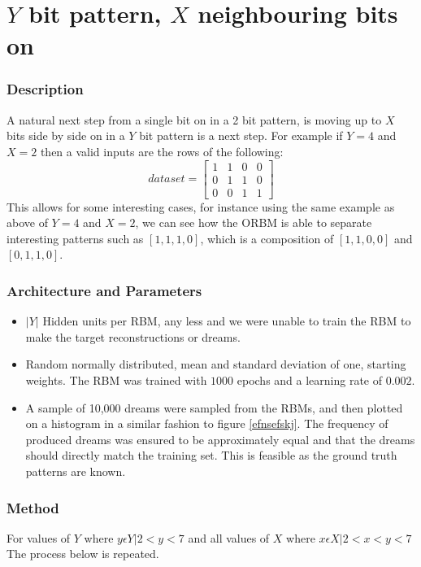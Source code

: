 \section{$Y$ bit pattern, $X$ neighbouring bits on}

\subsubsection{Description}
A natural next step from a single bit on in a 2 bit pattern, is moving up to $X$  bits side by side on in a $Y$ bit pattern is a next step. For example if $Y = 4 $ and $ X = 2 $ then a valid inputs are the rows of the following:
$$ dataset =
\begin{bmatrix}
  1 & 1 & 0 & 0 \\
  0 & 1 & 1 & 0 \\
  0 & 0 & 1 & 1
\end{bmatrix}
$$
This allows for some interesting cases, for instance using the same example as above of $Y = 4 $ and $ X = 2 $, we can see how the ORBM is able to separate interesting patterns such as $[1,1,1,0]$, which is a composition of $[1,1,0,0]$ and $[0,1,1,0]$.


\subsubsection{Architecture and Parameters}
\begin{itemize}
  \item $|Y|$ Hidden units per RBM, any less and we were unable to train the RBM to make the target reconstructions or dreams.
  \item Random normally distributed, mean and standard deviation of one, starting weights. The RBM was trained with $1000$ epochs and a learning rate of $0.002$.
  \item A sample of 10,000 dreams were sampled from the RBMs, and then plotted on a histogram in a similar fashion to figure \ref{efnsefskj}. The frequency of produced dreams was ensured to be approximately equal and that the dreams should directly match the training set. This is feasible as the ground truth patterns are known.
\end{itemize}


\subsubsection{Method}

For values of $Y$ where $y \epsilon Y \big| 2 < y < 7$ and all values of $X$ where $x \epsilon X \big| 2 < x < y < 7 $ The process below is repeated.

